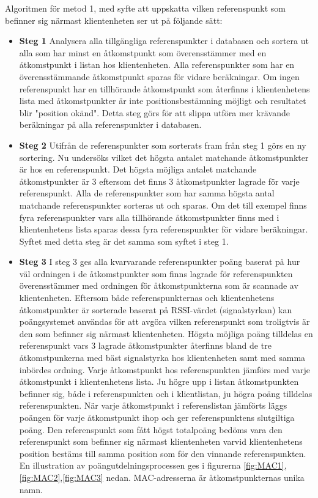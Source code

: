 \documentclass[swedish, a4paper,12pt]{article}
\begin{document}
Algoritmen för metod 1, med syfte att uppskatta vilken referenspunkt som befinner sig närmast klientenheten ser ut på följande sätt:

  \begin{itemize}
    \item \textbf{Steg 1}
    \newline
    Analysera alla tillgängliga referenspunkter i databasen och sortera ut alla som har minst en åtkomstpunkt som överensstämmer med en åtkomstpunkt i listan hos klientenheten. Alla referenspunkter som har en överensstämmande åtkomstpunkt sparas för vidare beräkningar. Om ingen referenspunkt har en tillhörande åtkomstpunkt som återfinns i klientenhetens lista med åtkomstpunkter är inte positionsbestämning möjligt och resultatet blir "position okänd".
    Detta steg görs för att slippa utföra mer krävande beräkningar på alla referenspunkter i databasen.
    \item \textbf{Steg 2}
    \newline
    Utifrån de referenspunkter som sorterats fram från steg 1 görs en ny sortering. Nu undersöks vilket det högsta antalet matchande åtkomstpunkter är hos en referenspunkt. Det högsta möjliga antalet matchande åtkomstpunkter är 3 eftersom det finns 3 åtkomstpunkter lagrade för varje referenspunkt. Alla de referenspunkter som har samma högsta antal matchande referenspunkter sorteras ut och sparas.
    Om det till exempel finns fyra referenspunkter vars alla tillhörande åtkomstpunkter finns med i klientenhetens lista sparas dessa fyra referenspunkter för vidare beräkningar. Syftet med detta steg är det samma som syftet i steg 1.

    \item \textbf{Steg 3}
    \newline
    I steg 3 ges alla kvarvarande referenspunkter poäng baserat på hur väl ordningen i de åtkomstpunkter som finns lagrade för referenspunkten överensstämmer med ordningen för åtkomstpunkterna som är scannade av klientenheten. Eftersom både referenspunkternas och klientenhetens åtkomstpunkter är sorterade baserat på RSSI-värdet (signalstyrkan) kan poängsystemet användas för att avgöra vilken referenspunkt som troligtvis är den som befinner sig närmast klientenheten.
    Högsta möjliga poäng tilldelas en referenspunkt vars 3 lagrade åtkomstpunkter återfinns bland de tre åtkomstpunkerna med bäst signalstyrka hos klientenheten samt med samma inbördes ordning. Varje åtkomstpunkt hos referenspunkten jämförs med varje åtkomstpunkt i klientenhetens lista. Ju högre upp i listan åtkomstpunkten befinner sig, både i referenspunkten och i klientlistan, ju högra poäng tilldelas referenspunkten. När varje åtkomstpunkt i referenslistan jämförts läggs poängen för varje åtkomstpunkt ihop och ger referenspunktens slutgiltiga poäng.
    Den referenspunkt som fått högst totalpoäng bedöms vara den referenspunkt som befinner sig närmast klientenheten varvid klientenhetens position bestäms till samma position som för den vinnande referenspunkten.
    En illustration av poängutdelningsprocessen ges i figurerna \ref{fig:MAC1},\ref{fig:MAC2},\ref{fig:MAC3} nedan.
    MAC-adresserna är åtkomstpunkternas unika namn.


\end{itemize}
\end{document}
